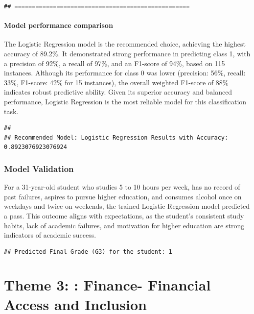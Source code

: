 \documentclass[preprint, 3p,
authoryear]{elsarticle} %
\begin{document}
\begin{verbatim}
## ==================================================
\end{verbatim}

\paragraph{Model performance
comparison}\label{model-performance-comparison}

\hfill\break
The Logistic Regression model is the recommended choice, achieving the
highest accuracy of 89.2\%. It demonstrated strong performance in
predicting class 1, with a precision of 92\%, a recall of 97\%, and an
F1-score of 94\%, based on 115 instances. Although its performance for
class 0 was lower (precision: 56\%, recall: 33\%, F1-score: 42\% for 15
instances), the overall weighted F1-score of 88\% indicates robust
predictive ability. Given its superior accuracy and balanced
performance, Logistic Regression is the most reliable model for this
classification task.

\begin{verbatim}
## 
## Recommended Model: Logistic Regression Results with Accuracy: 0.8923076923076924
\end{verbatim}

\subsubsection{Model Validation}\label{model-validation}

For a 31-year-old student who studies 5 to 10 hours per week, has no
record of past failures, aspires to pursue higher education, and
consumes alcohol once on weekdays and twice on weekends, the trained
Logistic Regression model predicted a pass. This outcome aligns with
expectations, as the student's consistent study habits, lack of academic
failures, and motivation for higher education are strong indicators of
academic success.

\begin{verbatim}
## Predicted Final Grade (G3) for the student: 1
\end{verbatim}

\section{Theme 3: : Finance- Financial Access and
Inclusion}\label{theme-3-finance--financial-access-and-inclusion}
\end{document}
